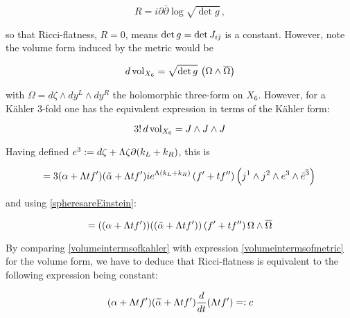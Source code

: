 \begin{equation}
	R = i \partial \bar\partial \log \sqrt{ \det g}\,,
	\label{}
\end{equation}

so that Ricci-flatness, $R = 0$, means $\det g = \det {J_{i\bar{\jmath}}}$ is a constant. However, note the volume form induced by the metric would be

\begin{equation}
	d\operatorname{vol}_{X_6} = \sqrt{\det g}\, \left(\Omega \wedge \overline \Omega\right)
	\label{volumeintermsofmetric}
\end{equation}

with $\Omega = d\zeta \wedge dy^L \wedge dy^R$ the holomorphic three-form on $X_6$. However, for a K\"ahler $3$-fold one has the equivalent expression in terms of the K\"ahler form:

\begin{equation}
	3! \, d\operatorname{vol}_{X_6} = J\wedge J \wedge J 	\label{}
\end{equation}

Having defined $e^3 := d\zeta + \Lambda \zeta \partial (k_L + k_R)$, this is

\begin{equation}
	= 3 (\alpha + \Lambda t f') (\tilde\alpha + \Lambda t f') i e^{\Lambda(k_L + k_R)} \left(f'+tf''\right) \left(j^1 \wedge j^2 \wedge e^3 \wedge \bar e^{\bar 3} \right)\,
	\label{}
\end{equation}

and using \eqref{spheresareEinstein}:

\begin{equation}
	= ((\alpha + \Lambda t f'))((\tilde\alpha + \Lambda t f')) \left( f' +tf'' \right) \Omega \wedge \overline \Omega
	\label{volumeintermsofkahler}
\end{equation}

By comparing \eqref{volumeintermsofkahler} with expression \eqref{volumeintermsofmetric} for the volume form, we have to deduce that Ricci-flatness is equivalent to the following expression being constant:


\begin{equation}
	(\alpha + \Lambda t f')(\widetilde{\alpha} + \Lambda t f') \frac{d}{dt} (\Lambda t f') =: c 
\end{equation}

